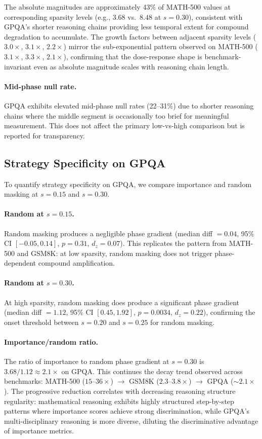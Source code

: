 \documentclass[11pt]{article}
\begin{document}
The absolute magnitudes are approximately 43\% of MATH-500 values at corresponding sparsity levels (e.g., $3.68$ vs.\ $8.48$ at $s=0.30$), consistent with GPQA's shorter reasoning chains providing less temporal extent for compound degradation to accumulate. The growth factors between adjacent sparsity levels ($3.0\times$, $3.1\times$, $2.2\times$) mirror the sub-exponential pattern observed on MATH-500 ($3.1\times$, $3.3\times$, $2.1\times$), confirming that the dose-response shape is benchmark-invariant even as absolute magnitude scales with reasoning chain length.

\paragraph{Mid-phase null rate.} GPQA exhibits elevated mid-phase null rates (22--31\%) due to shorter reasoning chains where the middle segment is occasionally too brief for meaningful measurement. This does not affect the primary low-vs-high comparison but is reported for transparency.

\subsection{Strategy Specificity on GPQA}
\label{sec:gpqa_strategy}

To quantify strategy specificity on GPQA, we compare importance and random masking at $s=0.15$ and $s=0.30$.

\paragraph{Random at $s=0.15$.} Random masking produces a negligible phase gradient (median diff $= 0.04$, 95\% CI $[-0.05, 0.14]$, $p = 0.31$, $d_z = 0.07$). This replicates the pattern from MATH-500 and GSM8K: at low sparsity, random masking does not trigger phase-dependent compound amplification.

\paragraph{Random at $s=0.30$.} At high sparsity, random masking does produce a significant phase gradient (median diff $= 1.12$, 95\% CI $[0.45, 1.92]$, $p = 0.0034$, $d_z = 0.22$), confirming the onset threshold between $s=0.20$ and $s=0.25$ for random masking.

\paragraph{Importance/random ratio.} The ratio of importance to random phase gradient at $s=0.30$ is $3.68 / 1.12 \approx 2.1\times$ on GPQA. This continues the decay trend observed across benchmarks: MATH-500 ($15$--$36\times$) $\rightarrow$ GSM8K ($2.3$--$3.8\times$) $\rightarrow$ GPQA ($\sim 2.1\times$). The progressive reduction correlates with decreasing reasoning structure regularity: mathematical reasoning exhibits highly structured step-by-step patterns where importance scores achieve strong discrimination, while GPQA's multi-disciplinary reasoning is more diverse, diluting the discriminative advantage of importance metrics.
\end{document}
